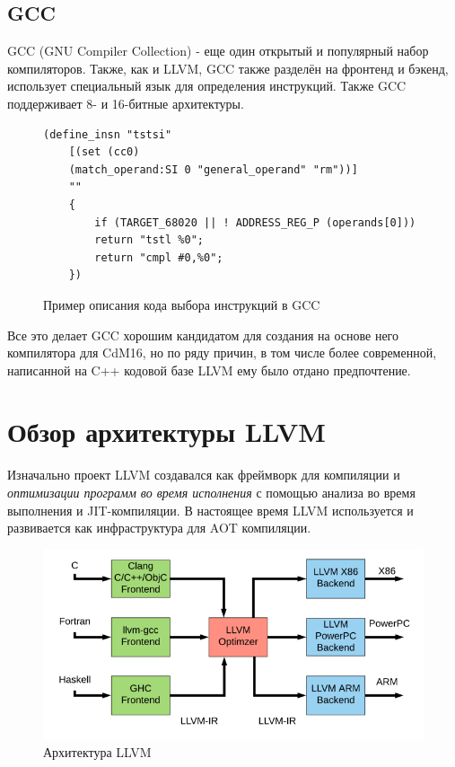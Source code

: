 \documentclass[a4paper,14pt]{extarticle}
\begin{document}
\subsection{GCC}
GCC (GNU Compiler Collection) - еще один открытый и популярный набор компиляторов. Также, как и LLVM, GCC также разделён на фронтенд и бэкенд, использует специальный язык для определения инструкций. Также GCC поддерживает 8- и 16-битные архитектуры.
\begin{figure}[h!]
	\begin{verbatim}
(define_insn "tstsi"
	[(set (cc0)
	(match_operand:SI 0 "general_operand" "rm"))]
	""
	{
		if (TARGET_68020 || ! ADDRESS_REG_P (operands[0]))
		return "tstl %0";
		return "cmpl #0,%0";
	})
	\end{verbatim}
	\caption{Пример описания кода выбора инструкций в GCC\cite{gcc:codegen}}
\end{figure}
Все это делает GCC хорошим кандидатом для создания на основе него компилятора для CdM16, но по ряду причин, в том числе более современной, написанной на C++ кодовой базе LLVM ему было отдано предпочтение.

\pagebreak
\section{Обзор архитектуры LLVM}

Изначально проект LLVM создавался как фреймворк для компиляции и \emph{оптимизации программ во время исполнения} с помощью анализа во время выполнения и JIT-компиляции\cite{LLVM:CGO04}. В настоящее время LLVM используется и развивается как инфраструктура для AOT компиляции.
\begin{figure}[!h]
	\begin{center}
		\includegraphics[width=\textwidth]{LLVM-Compiler-Development-architecture.png}
		\caption{Архитектура LLVM \cite{llvmpic}}
	\end{center}
\end{figure}
\end{document}
